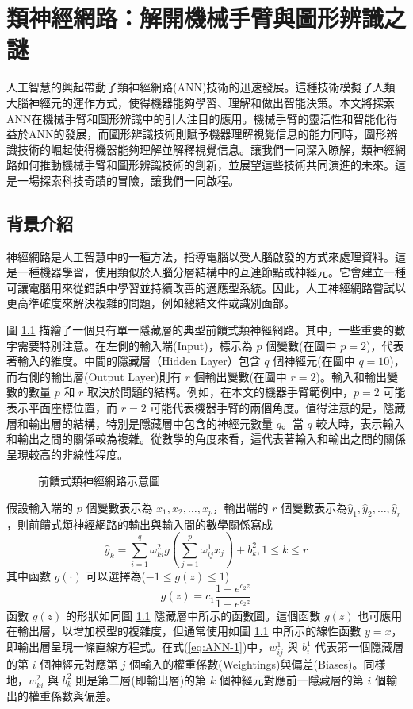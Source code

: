 \chapter{類神經網路：解開機械手臂與圖形辨識之謎}
人工智慧的興起帶動了類神經網路(ANN)技術的迅速發展。這種技術模擬了人類大腦神經元的運作方式，使得機器能夠學習、理解和做出智能決策。本文將探索ANN在機械手臂和圖形辨識中的引人注目的應用。機械手臂的靈活性和智能化得益於ANN的發展，而圖形辨識技術則賦予機器理解視覺信息的能力同時，圖形辨識技術的崛起使得機器能夠理解並解釋視覺信息。讓我們一同深入瞭解，類神經網路如何推動機械手臂和圖形辨識技術的創新，並展望這些技術共同演進的未來。這是一場探索科技奇蹟的冒險，讓我們一同啟程。

\section{背景介紹}
神經網路是人工智慧中的一種方法，指導電腦以受人腦啟發的方式來處理資料。這是一種機器學習，使用類似於人腦分層結構中的互連節點或神經元。它會建立一種可讓電腦用來從錯誤中學習並持續改善的適應型系統。因此，人工神經網路嘗試以更高準確度來解決複雜的問題，例如總結文件或識別面部。

圖 \ref{fig:ANN(hidden1)} 描繪了一個具有單一隱藏層的典型前饋式類神經網路。其中，一些重要的數字需要特別注意。在左側的輸入端(Input)，標示為 $p$ 個變數(在圖中 $p = 2$)，代表著輸入的維度。中間的隱藏層（Hidden Layer）包含 $q$ 個神經元(在圖中 $q = 10$)，而右側的輸出層(Output Layer)則有 $r$ 個輸出變數(在圖中 $r = 2$)。輸入和輸出變數的數量 $p$ 和 $r$ 取決於問題的結構。例如，在本文的機器手臂範例中，$p = 2$ 可能表示平面座標位置，而 $r = 2$ 可能代表機器手臂的兩個角度。值得注意的是，隱藏層和輸出層的結構，特別是隱藏層中包含的神經元數量 $q$。當 $q$ 較大時，表示輸入和輸出之間的關係較為複雜。從數學的角度來看，這代表著輸入和輸出之間的關係呈現較高的非線性程度。
\begin{figure}[h]
    \caption{前饋式類神經網路示意圖}
    \label{fig:ANN(hidden1)}
\end{figure}

假設輸入端的 $p$ 個變數表示為 $x_1, x_2,\dots , x_p$，輸出端的 $r$ 個變數表示為$\hat{y}_1, \hat{y}_2,\dots , \hat{y}_r$，則前饋式類神經網路的輸出與輸入間的數學關係寫成
\begin{equation}\label{eq:ANN-1}
\hat{y}_k=\sum_{i=1}^q\omega^2_{ki}g\left(\sum_{j=1}^p\omega^1_{ij}x_j\right)+b^2_k,1\leq k\leq r
\end{equation}
其中函數 $g(·)$ 可以選擇為($−1\leq g(z)\leq 1$)
\begin{equation}\label{eq:ANN-2}
g(z)=c_1\frac{1-e^{c_2z}}{1+e^{c_2z}}
\end{equation}
函數 $g(z)$ 的形狀如同圖 \ref{fig:ANN(hidden1)} 隱藏層中所示的函數圖。這個函數 $g(z)$ 也可應用在輸出層，以增加模型的複雜度，但通常使用如圖 \ref{fig:ANN(hidden1)} 中所示的線性函數 $y = x$，即輸出層呈現一條直線方程式。在式(\ref{eq:ANN-1})中，$w^1_{ij}$ 與 $b^1_i$ 代表第一個隱藏層的第 $i$ 個神經元對應第 $j$ 個輸入的權重係數(Weightings)與偏差(Biases)。同樣地，$w^2_{ki}$ 與 $b^2_k$ 則是第二層(即輸出層)的第 $k$ 個神經元對應前一隱藏層的第 $i$ 個輸出的權重係數與偏差。

